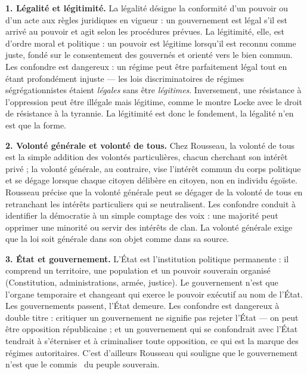 \documentclass[11pt]{article}
\begin{document}
\begin{corrige}

\textbf{1. Légalité et légitimité.} La légalité désigne la conformité d'un pouvoir ou d'un acte aux règles juridiques en vigueur : un gouvernement est légal s'il est arrivé au pouvoir et agit selon les procédures prévues. La légitimité, elle, est d'ordre moral et politique : un pouvoir est légitime lorsqu'il est reconnu comme juste, fondé sur le consentement des gouvernés et orienté vers le bien commun. Les confondre est dangereux : un régime peut être parfaitement légal tout en étant profondément injuste — les lois discriminatoires de régimes ségrégationnistes étaient \emph{légales} sans être \emph{légitimes}. Inversement, une résistance à l'oppression peut être illégale mais légitime, comme le montre Locke avec le droit de résistance à la tyrannie. La légitimité est donc le fondement, la légalité n'en est que la forme.

\textbf{2. Volonté générale et volonté de tous.} Chez Rousseau, la volonté de tous est la simple addition des volontés particulières, chacun cherchant son intérêt privé ; la volonté générale, au contraire, vise l'intérêt commun du corps politique et se dégage lorsque chaque citoyen délibère en citoyen, non en individu égoïste. Rousseau précise que la volonté générale peut se dégager de la volonté de tous en retranchant les intérêts particuliers qui se neutralisent. Les confondre conduit à identifier la démocratie à un simple comptage des voix : une majorité peut opprimer une minorité ou servir des intérêts de clan. La volonté générale exige que la loi soit générale dans son objet comme dans sa source.

\textbf{3. État et gouvernement.} L'État est l'institution politique permanente : il comprend un territoire, une population et un pouvoir souverain organisé (Constitution, administrations, armée, justice). Le gouvernement n'est que l'organe temporaire et changeant qui exerce le pouvoir exécutif au nom de l'État. Les gouvernements passent, l'État demeure. Les confondre est dangereux à double titre : critiquer un gouvernement ne signifie pas rejeter l'État — on peut être opposition républicaine ; et un gouvernement qui se confondrait avec l'État tendrait à s'éterniser et à criminaliser toute opposition, ce qui est la marque des régimes autoritaires. C'est d'ailleurs Rousseau qui souligne que le gouvernement n'est que le \guillemotleft commis \guillemotright\ du peuple souverain.


\end{corrige}
\end{document}
